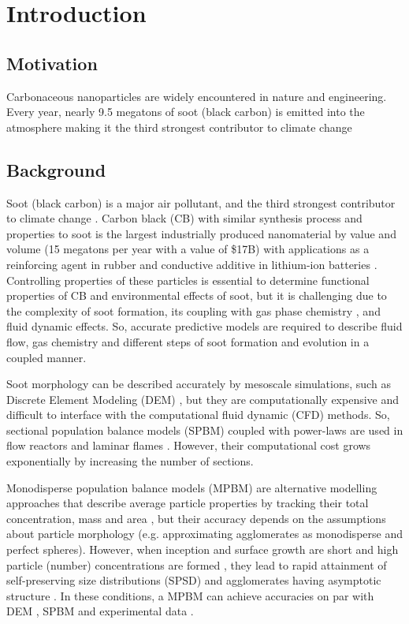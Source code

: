 \chapter{Introduction}

\section{Motivation}
Carbonaceous nanoparticles are widely encountered in nature and engineering. Every year, nearly 9.5 megatons of soot (black carbon) is emitted into the atmosphere making it the third strongest contributor to climate change 

\section{Background}

Soot (black carbon) is a major air pollutant, and the third strongest contributor to climate change \cite{myhre2014anthropogenic}. Carbon black (CB) with similar synthesis process and properties to soot is the largest industrially produced nanomaterial by value and volume (15 megatons per year with a value of \$17B) with applications as a reinforcing agent in rubber \cite{international2017} and conductive additive in lithium-ion batteries \cite{Palomares2010}. Controlling properties of these particles is essential to determine functional properties of CB and environmental effects of soot, but it is challenging due to the complexity of soot formation, its coupling with gas phase chemistry \cite{Wang2011}, and fluid dynamic effects. So, accurate predictive models are required to describe fluid flow, gas chemistry and different steps of soot formation and evolution in a coupled manner.

Soot morphology can be described accurately by mesoscale simulations, such as Discrete Element Modeling (DEM) \cite{Kelesidis2017Flame}, but they are computationally expensive and difficult to interface with the computational fluid dynamic (CFD) methods. So, sectional population balance models (SPBM) coupled with power-laws are used in flow reactors \cite{naseri2022simulating} and laminar flames \cite{kholghy2016core}. However, their computational cost grows exponentially by increasing the number of sections.

Monodisperse population balance models (MPBM) are alternative modelling approaches that describe average particle properties by tracking their total concentration, mass and area \cite{Kholghy2021}, but their accuracy depends on the assumptions about particle morphology (e.g. approximating agglomerates as monodisperse and perfect spheres). However, when inception and surface growth are short \cite{Spicer2002} and high particle (number) concentrations are formed \cite{Kelesidis2017}, they lead to rapid attainment of self-preserving size distributions (SPSD) and agglomerates having asymptotic structure \cite{Goudeli2016}. In these conditions, a MPBM can achieve accuracies on par with DEM \cite{Kelesidis2017Flame}, SPBM \cite{Kelesidis2019} and experimental data \cite{Kholghy2021}.



